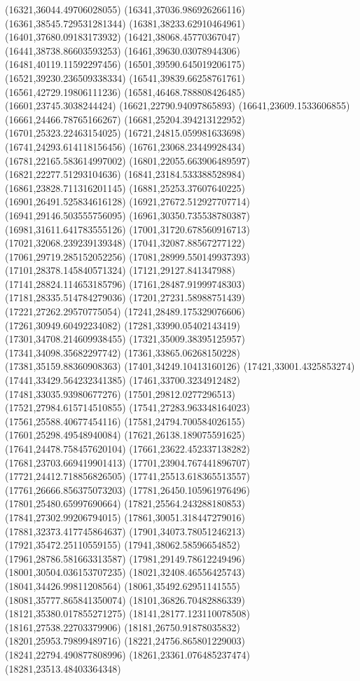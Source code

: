 {(16321,36044.49706028055)
(16341,37036.986926266116)
(16361,38545.729531281344)
(16381,38233.62910464961)
(16401,37680.09183173932)
(16421,38068.45770367047)
(16441,38738.86603593253)
(16461,39630.03078944306)
(16481,40119.11592297456)
(16501,39590.645019206175)
(16521,39230.236509338334)
(16541,39839.66258761761)
(16561,42729.19806111236)
(16581,46468.788808426485)
(16601,23745.3038244424)
(16621,22790.94097865893)
(16641,23609.1533606855)
(16661,24466.78765166267)
(16681,25204.394213122952)
(16701,25323.22463154025)
(16721,24815.059981633698)
(16741,24293.614118156456)
(16761,23068.23449928434)
(16781,22165.583614997002)
(16801,22055.663906489597)
(16821,22277.51293104636)
(16841,23184.533388528984)
(16861,23828.711316201145)
(16881,25253.37607640225)
(16901,26491.525834616128)
(16921,27672.512927707714)
(16941,29146.503555756095)
(16961,30350.735538780387)
(16981,31611.641783555126)
(17001,31720.678560916713)
(17021,32068.239239139348)
(17041,32087.88567277122)
(17061,29719.285152052256)
(17081,28999.550149937393)
(17101,28378.145840571324)
(17121,29127.841347988)
(17141,28824.114653185796)
(17161,28487.91999748303)
(17181,28335.514784279036)
(17201,27231.58988751439)
(17221,27262.29570775054)
(17241,28489.175329076606)
(17261,30949.60492234082)
(17281,33990.05402143419)
(17301,34708.214609938455)
(17321,35009.38395125957)
(17341,34098.35682297742)
(17361,33865.06268150228)
(17381,35159.88360908363)
(17401,34249.10413160126)
(17421,33001.4325853274)
(17441,33429.564232341385)
(17461,33700.3234912482)
(17481,33035.93980677276)
(17501,29812.0277296513)
(17521,27984.615714510855)
(17541,27283.963348164023)
(17561,25588.40677454116)
(17581,24794.700584026155)
(17601,25298.49548940084)
(17621,26138.189075591625)
(17641,24478.758457620104)
(17661,23622.452337138282)
(17681,23703.669419901413)
(17701,23904.767441896707)
(17721,24412.718856826505)
(17741,25513.618365513557)
(17761,26666.856375073203)
(17781,26450.105961976496)
(17801,25480.65997690664)
(17821,25564.243288180853)
(17841,27302.99206794015)
(17861,30051.318447279016)
(17881,32373.417745864637)
(17901,34073.78051246213)
(17921,35472.25110559155)
(17941,38062.58596654852)
(17961,28786.581663313587)
(17981,29149.78612249496)
(18001,30504.036153707235)
(18021,32408.46556425743)
(18041,34426.99811208564)
(18061,35492.62951141555)
(18081,35777.865841350074)
(18101,36826.70482886339)
(18121,35380.017855271275)
(18141,28177.123110078508)
(18161,27538.22703379906)
(18181,26750.91878035832)
(18201,25953.79899489716)
(18221,24756.865801229003)
(18241,22794.490877808996)
(18261,23361.076485237474)
(18281,23513.48403364348)
}
